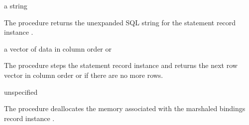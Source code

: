 \begin{procedure}
\end{procedure}
\returns{} a string

The  procedure returns the unexpanded SQL string for
the statement record instance .

\begin{procedure}
\end{procedure}
\returns{} a vector of data in column order or 

The  procedure steps the statement record instance
 and returns the next row vector in column order or
 if there are no more rows.

\begin{procedure}
\end{procedure}
\returns{} unspecified

The  procedure deallocates the memory
associated with the marshaled bindings record instance
.
